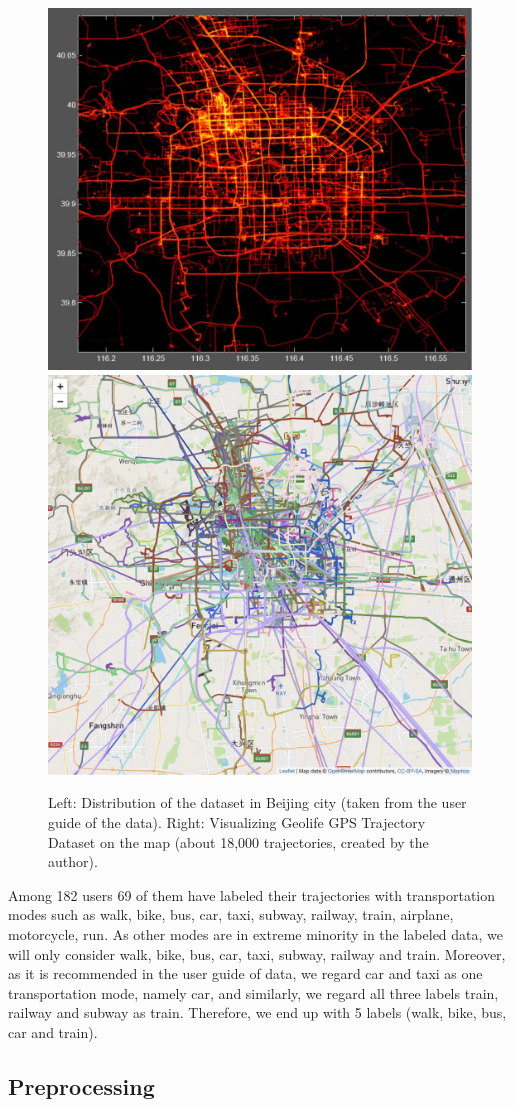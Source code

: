 \documentclass[11pt]{myclass}
\begin{document}
\begin{figure}[h]
\includegraphics[width=0.5 \textwidth]{data1}
\hfill
\includegraphics[width=0.451 \textwidth]{Geolife} 
\caption{Left: Distribution of the dataset in Beijing city (taken from the user guide of the data). Right: Visualizing Geolife GPS Trajectory Dataset on the map (about 18,000 trajectories, created by the author).}
\label{data}
\end{figure}

Among 182 users 69 of them have labeled their trajectories with transportation modes such as walk, bike, bus, car, taxi, subway, railway, train, airplane, motorcycle, run. As other modes are in extreme minority in the labeled data, we will only consider walk, bike, bus, car, taxi, subway, railway and train. Moreover, as it is recommended in the user guide of data, we regard car and taxi as one transportation mode, namely car, and similarly, we regard all three labels train, railway and subway as train. Therefore, we end up with 5 labels (walk, bike, bus, car and train). 

\subsection{Preprocessing} 
\end{document}
